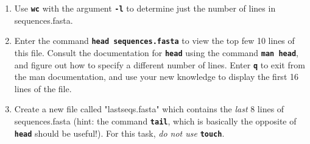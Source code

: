 \documentclass{article}[12pt]
\newcommand{\code}[1]{\textbf{\texttt{#1}}}
\begin{document}
\begin{enumerate}[itemsep=5ex]
\begin{enumerate}[itemsep=2ex]
		\item Use \code{wc} with the argument \code{-l} to determine just the number of lines in sequences.fasta.
		
		\item Enter the command \code{head sequences.fasta} to view the top few 10 lines of this file. Consult the documentation for \code{head} using the command \code{man head}, and figure out how to specify a different number of lines. Enter \code{q} to exit from the man documentation, and use your new knowledge to display the first 16 lines of the file.
		 
		\item Create a new file called "lastseqs.fasta" which contains the \emph{last} 8 lines of sequences.fasta (hint: the command \code{tail}, which is basically the opposite of \code{head} should be useful!). For this task, \emph{do not use} \code{touch}.
	\end{enumerate}
			
	

\end{enumerate}
\end{document}
